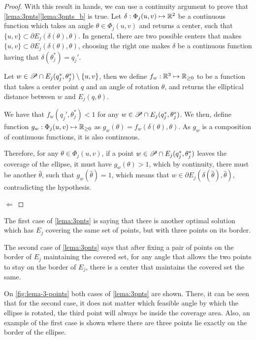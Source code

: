 \begin{proof}
	With this result in hands, we can use a continuity argument to prove that \autoref{lema:3pnts}\ref{lema:3pnts_b} is true.
	Let $\delta : \Phi_j(u,v) \mapsto \mathbb{R}^2$ be a continuous function which takes an angle $\theta\in\Phi_j(u,v)$ and returns a center, such that $\{u,v\} \subset \partial E_j(\delta(\theta), \theta)$. In general, there are two possible centers that makes $\{u,v\} \subset \partial E_j(\delta(\theta), \theta)$, choosing the right one makes $\delta$ be a continuous function having that $\delta(\theta_j^*) = q_j'$.
	
	Let $w\in \mathscr{P} \cap E_j(q_j^*, \theta_j^*) \setminus \{u,v\}$, then we define $f_w  : \mathbb{R}^3 \mapsto \mathbb{R}_{\ge0}$ to be a function that takes a center point $q$ and an angle of rotation $\theta$, and returns the elliptical distance between $w$ and $E_j(q, \theta)$.
	
	We have that $f_w(q_j', \theta_j^*) < 1$ for any $w\in \mathscr{P} \cap E_j(q_j^*, \theta_j^*)$. We then, define function $g_w : \Phi_j(u,v) \mapsto \mathbb{R}_{\ge0}$ as $g_w(\theta) = f_w(\delta(\theta), \theta)$. As $g_w$ is a composition of continuous functions, it is also continuous.
	
	Therefore, for any $\theta\in\Phi_j(u,v)$, if a point $w \in \mathscr{P} \cap E_j(q_j^*, \theta_j^*)$ leaves the coverage of the ellipse, it must have $g_w(\theta)>1$, which by continuity, there must be another $\hat{\theta}$, such that $g_w(\hat{\theta})=1$, which means that $w\in \partial E_j(\delta(\hat{\theta}), \hat{\theta})$, contradicting the hypothesis.
	
	$\Leftarrow$

\end{proof}

The first case of \autoref{lema:3pnts} is saying that there is another optimal solution which has $E_j$ covering the same set of points, but with three points on its border. 

The second case of \autoref{lema:3pnts} says that after fixing a pair of points on the border of $E_j$ maintaining the covered set, for any angle that allows the two points to stay on the border of $E_j$, there is a center that maintains the covered set the same.

On \autoref{fig:lema-3-points} both cases of \autoref{lema:3pnts} are shown. There, it can be seen that for the second case, it does not matter which feasible angle by which the ellipse is rotated, the third point will always be inside the coverage area. Also, an example of the first case is shown where there are three points lie exactly on the border of the ellipse.

